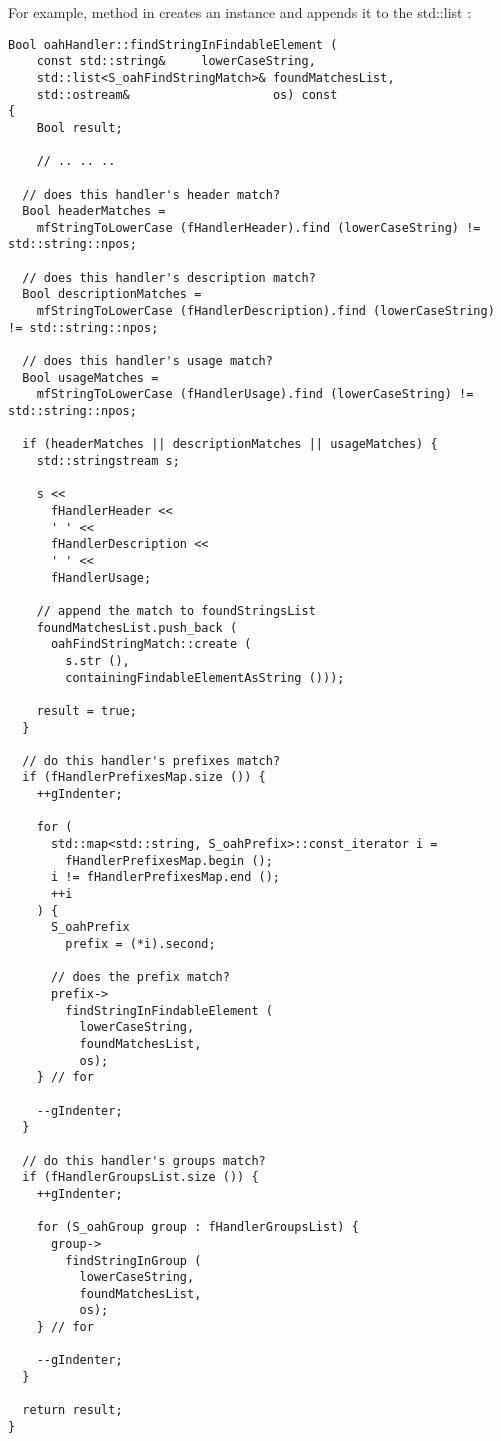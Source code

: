 For example, method  in  creates an instance and appends it to the std::list :
\begin{lstlisting}[language=Terminal]
Bool oahHandler::findStringInFindableElement (
	const std::string&     lowerCaseString,
	std::list<S_oahFindStringMatch>& foundMatchesList,
	std::ostream&                    os) const
{
	Bool result;

	// .. .. ..

  // does this handler's header match?
  Bool headerMatches =
    mfStringToLowerCase (fHandlerHeader).find (lowerCaseString) != std::string::npos;

  // does this handler's description match?
  Bool descriptionMatches =
    mfStringToLowerCase (fHandlerDescription).find (lowerCaseString) != std::string::npos;

  // does this handler's usage match?
  Bool usageMatches =
    mfStringToLowerCase (fHandlerUsage).find (lowerCaseString) != std::string::npos;

  if (headerMatches || descriptionMatches || usageMatches) {
    std::stringstream s;

    s <<
      fHandlerHeader <<
      ' ' <<
      fHandlerDescription <<
      ' ' <<
      fHandlerUsage;

    // append the match to foundStringsList
    foundMatchesList.push_back (
      oahFindStringMatch::create (
        s.str (),
        containingFindableElementAsString ()));

    result = true;
  }

  // do this handler's prefixes match?
  if (fHandlerPrefixesMap.size ()) {
    ++gIndenter;

    for (
      std::map<std::string, S_oahPrefix>::const_iterator i =
        fHandlerPrefixesMap.begin ();
      i != fHandlerPrefixesMap.end ();
      ++i
    ) {
      S_oahPrefix
        prefix = (*i).second;

      // does the prefix match?
      prefix->
        findStringInFindableElement (
          lowerCaseString,
          foundMatchesList,
          os);
    } // for

    --gIndenter;
  }

  // do this handler's groups match?
  if (fHandlerGroupsList.size ()) {
    ++gIndenter;

    for (S_oahGroup group : fHandlerGroupsList) {
      group->
        findStringInGroup (
          lowerCaseString,
          foundMatchesList,
          os);
    } // for

    --gIndenter;
  }

  return result;
}
\end{lstlisting}

